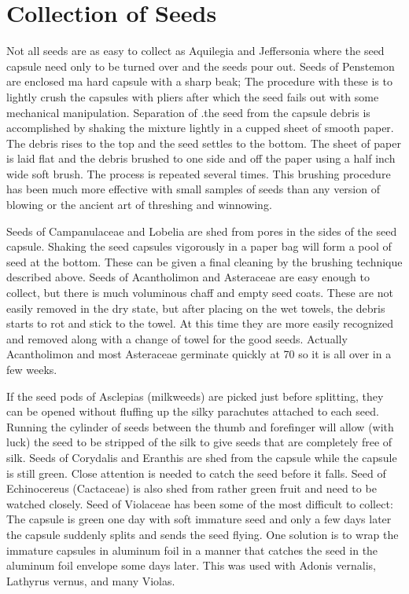 \chapter{Collection of Seeds}

Not all seeds are as easy to collect as Aquilegia and Jeffersonia where the
seed capsule need only to be turned over and the seeds pour out. Seeds of
Penstemon are enclosed ma hard capsule with a sharp beak; The procedure with
these is to lightly crush the capsules with pliers after which the seed fails out with some
mechanical manipulation. Separation of .the seed from the capsule debris is
accomplished by shaking the mixture lightly in a cupped sheet of smooth paper. The
debris rises to the top and the seed settles to the bottom. The sheet of paper is laid flat
and the debris brushed to one side and off the paper using a half inch wide soft brush.
The process is repeated several times. This brushing procedure has been much more
effective with small samples of seeds than any version of blowing or the ancient art of
threshing and winnowing.

Seeds of Campanulaceae and Lobelia are shed from pores in the sides of the
seed capsule. Shaking the seed capsules vigorously in a paper bag will form a pool
of seed at the bottom. These can be given a final cleaning by the brushing technique
described above. Seeds of Acantholimon and Asteraceae are easy enough to collect,
but there is much voluminous chaff and empty seed coats. These are not easily
removed in the dry state, but after placing on the wet towels, the debris starts to rot and
stick to the towel. At this time they are more easily recognized and removed along with
a change of towel for the good seeds. Actually Acantholimon and most Asteraceae
germinate quickly at 70 so it is all over in a few weeks.

If the seed pods of Asclepias (milkweeds) are picked just before splitting, they
can be opened without fluffing up the silky parachutes attached to each seed.
Running the cylinder of seeds between the thumb and forefinger will allow (with luck)
the seed to be stripped of the silk to give seeds that are completely free of silk.
Seeds of Corydalis and Eranthis are shed from the capsule while the capsule is
still green. Close attention is needed to catch the seed before it falls. Seed of
Echinocereus (Cactaceae) is also shed from rather green fruit and need to be watched
closely. Seed of Violaceae has been some of the most difficult to collect: The capsule
is green one day with soft immature seed and only a few days later the capsule
suddenly splits and sends the seed flying. One solution is to wrap the immature
capsules in aluminum foil in a manner that catches the seed in the aluminum foil
envelope some days later. This was used with Adonis vernalis, Lathyrus vernus, and
many Violas.

